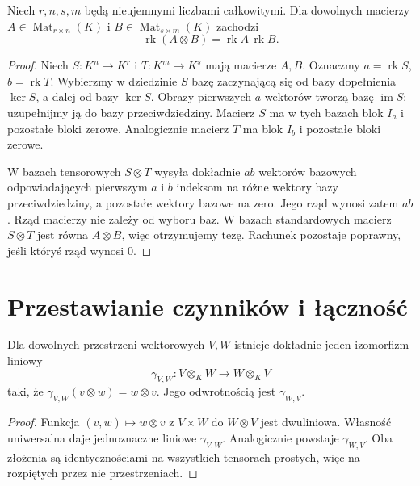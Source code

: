 \begin{twierdzenie}
\label{thm:lin9-rzad-kronecker}
Niech \(r,n,s,m\) będą
nieujemnymi liczbami całkowitymi.
Dla dowolnych macierzy
\(A\in\operatorname{Mat}_{r\times n}(K)\)
i \(B\in\operatorname{Mat}_{s\times m}(K)\)
zachodzi
\[
 \operatorname{rk}(A\otimes B)
 =\operatorname{rk}A\,\operatorname{rk}B.
\]
\end{twierdzenie}
\begin{proof}
Niech \(S\colon K^n\to K^r\)
i \(T\colon K^m\to K^s\)
mają macierze \(A,B\).
Oznaczmy
\(a=\operatorname{rk}S\),
\(b=\operatorname{rk}T\).
Wybierzmy w dziedzinie \(S\)
bazę zaczynającą się od
bazy dopełnienia \(\ker S\),
a dalej od bazy \(\ker S\).
Obrazy pierwszych \(a\) wektorów
tworzą bazę \(\operatorname{im}S\);
uzupełnijmy ją do bazy
przeciwdziedziny.
Macierz \(S\) ma w tych bazach
blok \(I_a\) i pozostałe
bloki zerowe. Analogicznie
macierz \(T\) ma blok \(I_b\)
i pozostałe bloki zerowe.

W bazach tensorowych
\(S\otimes T\) wysyła
dokładnie \(ab\) wektorów
bazowych odpowiadających
pierwszym \(a\) i \(b\)
indeksom na różne wektory
bazy przeciwdziedziny,
a pozostałe wektory bazowe
na zero. Jego rząd wynosi
zatem \(ab\).
Rząd macierzy nie zależy
od wyboru baz.
W bazach standardowych
macierz \(S\otimes T\)
jest równa \(A\otimes B\),
więc otrzymujemy tezę.
Rachunek pozostaje poprawny,
jeśli któryś rząd wynosi \(0\).
\end{proof}

\section{Przestawianie czynników i łączność}
\label{sec:lin9-kanoniczne}

\begin{twierdzenie}
\label{thm:lin9-zamiana}
Dla dowolnych przestrzeni
wektorowych \(V,W\) istnieje
dokładnie jeden izomorfizm liniowy
\[
 \gamma_{V,W}\colon V\otimes_KW\to W\otimes_KV
\]
taki, że
\(\gamma_{V,W}(v\otimes w)=w\otimes v\).
Jego odwrotnością jest \(\gamma_{W,V}\).
\end{twierdzenie}
\begin{proof}
Funkcja \((v,w)\mapsto w\otimes v\)
z \(V\times W\) do \(W\otimes V\)
jest dwuliniowa.
Własność uniwersalna daje
jednoznaczne liniowe \(\gamma_{V,W}\).
Analogicznie powstaje \(\gamma_{W,V}\).
Oba złożenia są identycznościami
na wszystkich tensorach prostych,
więc na rozpiętych przez nie
przestrzeniach.
\end{proof}

